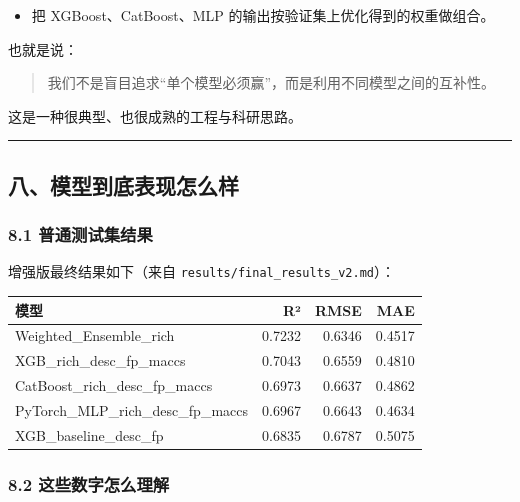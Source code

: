 \documentclass[
  ,
]{ctexart}
\providecommand{\tightlist}{%
  \setlength{\itemsep}{0pt}\setlength{\parskip}{0pt}}
\begin{document}
\begin{itemize}
\tightlist
\item
  把 XGBoost、CatBoost、MLP 的输出按验证集上优化得到的权重做组合。
\end{itemize}

也就是说：

\begin{quote}
我们不是盲目追求``单个模型必须赢''，而是利用不同模型之间的互补性。
\end{quote}

这是一种很典型、也很成熟的工程与科研思路。

\begin{center}\rule{0.5\linewidth}{0.5pt}\end{center}

\hypertarget{ux516bux6a21ux578bux5230ux5e95ux8868ux73b0ux600eux4e48ux6837}{%
\subsection{八、模型到底表现怎么样}\label{ux516bux6a21ux578bux5230ux5e95ux8868ux73b0ux600eux4e48ux6837}}

\hypertarget{ux666eux901aux6d4bux8bd5ux96c6ux7ed3ux679c}{%
\subsubsection{8.1
普通测试集结果}\label{ux666eux901aux6d4bux8bd5ux96c6ux7ed3ux679c}}

增强版最终结果如下（来自 \texttt{results/final\_results\_v2.md}）：

\begin{longtable}[]{@{}lrrr@{}}
\toprule
模型 & R² & RMSE & MAE \\
\midrule
\endhead
Weighted\_Ensemble\_rich & 0.7232 & 0.6346 & 0.4517 \\
XGB\_rich\_desc\_fp\_maccs & 0.7043 & 0.6559 & 0.4810 \\
CatBoost\_rich\_desc\_fp\_maccs & 0.6973 & 0.6637 & 0.4862 \\
PyTorch\_MLP\_rich\_desc\_fp\_maccs & 0.6967 & 0.6643 & 0.4634 \\
XGB\_baseline\_desc\_fp & 0.6835 & 0.6787 & 0.5075 \\
\bottomrule
\end{longtable}

\hypertarget{ux8fd9ux4e9bux6570ux5b57ux600eux4e48ux7406ux89e3}{%
\subsubsection{8.2
这些数字怎么理解}\label{ux8fd9ux4e9bux6570ux5b57ux600eux4e48ux7406ux89e3}}
\end{document}
